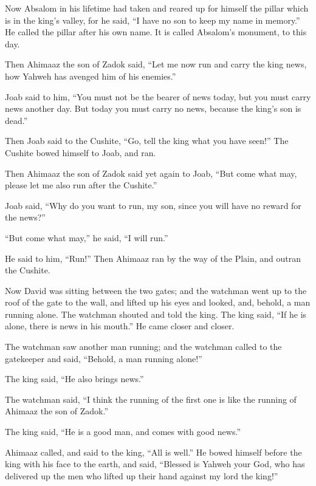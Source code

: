  Now Absalom in his lifetime had taken and reared up for
himself the pillar which is in the king's valley, for he said, ``I have
no son to keep my name in memory.'' He called the pillar after his own
name. It is called Absalom's monument, to this day.

 Then Ahimaaz the son of Zadok said, ``Let me now run and
carry the king news, how Yahweh has avenged him of his enemies.''

 Joab said to him, ``You must not be the bearer of news
today, but you must carry news another day. But today you must carry no
news, because the king's son is dead.''

 Then Joab said to the Cushite, ``Go, tell the king what
you have seen!'' The Cushite bowed himself to Joab, and ran.

 Then Ahimaaz the son of Zadok said yet again to Joab,
``But come what may, please let me also run after the Cushite.''

Joab said, ``Why do you want to run, my son, since you will have no
reward for the news?''

 ``But come what may,'' he said, ``I will run.''

He said to him, ``Run!'' Then Ahimaaz ran by the way of the Plain, and
outran the Cushite.

 Now David was sitting between the two gates; and the
watchman went up to the roof of the gate to the wall, and lifted up his
eyes and looked, and, behold, a man running alone.  The
watchman shouted and told the king. The king said, ``If he is alone,
there is news in his mouth.'' He came closer and closer.

 The watchman saw another man running; and the watchman
called to the gatekeeper and said, ``Behold, a man running alone!''

The king said, ``He also brings news.''

 The watchman said, ``I think the running of the first one
is like the running of Ahimaaz the son of Zadok.''

The king said, ``He is a good man, and comes with good news.''

 Ahimaaz called, and said to the king, ``All is well.'' He
bowed himself before the king with his face to the earth, and said,
``Blessed is Yahweh your God, who has delivered up the men who lifted up
their hand against my lord the king!''

